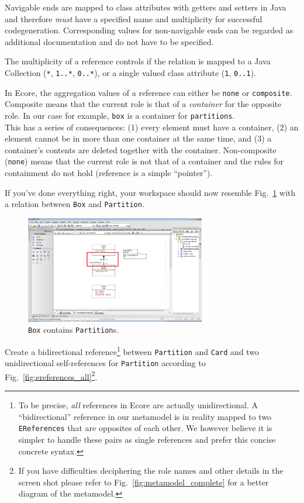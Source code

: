 Navigable ends are mapped to class attributes with getters and setters in Java
and therefore \emph{must} have a specified name and  multiplicity for successful
codegeneration.  
Corresponding values for non-navigable ends can  be regarded as additional
documentation and do not have to be specified.
 
The multiplicity of a reference controls if the relation is mapped to a Java
Collection (\texttt{*},  \texttt{1..*}, \texttt{0..*}), or a single valued class
attribute (\texttt{1}, \texttt{0..1}).

In Ecore, the aggregation values of a reference can either be \texttt{none} or
\texttt{com\-po\-site}.  Composite means that the current role is that of a
\emph{container} for the opposite role.  In our case for example, \texttt{box}
is a container for \texttt{partitions}.\\  This has a series of
consequences: (1) every element must have a container, (2) an element cannot be
in more than one container at the same time, and (3) a container's contents are
deleted together with the container.  Non-composite (\texttt{none}) means that
the current role is not that of a container and the rules for containment do not
hold (reference is a simple ``pointer'').

If you've done everything right, your workspace should now resemble
Fig.~\ref{fig:ereference_completed} with a relation between \texttt{Box} and
\texttt{Partition}.

\begin{figure}[htbp] 
	\centering
  \includegraphics[width=0.7\textwidth]{pics/memBoxBilder/memBox28.png}
	\caption{\texttt{Box} contains \texttt{Partition}s.}
	\label{fig:ereference_completed}
\end{figure}

Create a bidirectional reference\footnote{To be precise, \emph{all} references
in Ecore are actually unidirectional.  A ``bidirectional'' reference in our
metamodel is in reality mapped to two \texttt{EReferences} that are opposites of
each other.  
We however believe it is simpler to handle these pairs as single references and
prefer this concise concrete syntax.} between \texttt{Partition} and \texttt{Card}
and two unidirectional self-references for \texttt{Partition} according to
Fig.~\ref{fig:ereferences_all}\footnote{If you have difficulties deciphering
the role names and other details in the screen shot please refer to
Fig.~\ref{fig:metamodel_complete} for a better diagram of the metamodel.}.
 
